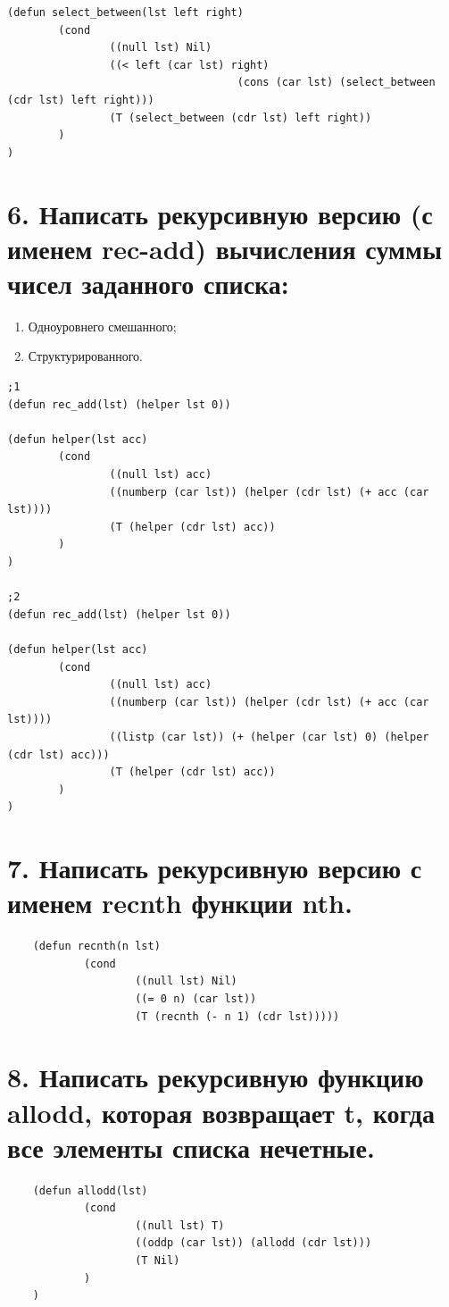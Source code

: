 \documentclass[12pt]{report}
\begin{document}
\begin{lstlisting}
(defun select_between(lst left right)
		(cond
				((null lst) Nil)
				((< left (car lst) right) 
									(cons (car lst) (select_between (cdr lst) left right)))
				(T (select_between (cdr lst) left right))
		)
)
\end{lstlisting}

\clearpage
\section*{6. Написать рекурсивную версию (с именем rec-add) вычисления суммы чисел заданного списка:}

\begin{enumerate}
	\item Одноуровнего смешанного;
	\item Структурированного.
\end{enumerate}

\begin{lstlisting}
;1
(defun rec_add(lst) (helper lst 0))

(defun helper(lst acc)
		(cond
				((null lst) acc)
				((numberp (car lst)) (helper (cdr lst) (+ acc (car lst))))
				(T (helper (cdr lst) acc))
		)
)

;2
(defun rec_add(lst) (helper lst 0))

(defun helper(lst acc)
		(cond 
				((null lst) acc)
				((numberp (car lst)) (helper (cdr lst) (+ acc (car lst))))
				((listp (car lst)) (+ (helper (car lst) 0) (helper (cdr lst) acc)))
				(T (helper (cdr lst) acc))
		)
)
\end{lstlisting}

\section*{7. Написать рекурсивную версию с именем recnth функции nth.}

\begin{lstlisting}
	(defun recnth(n lst)
			(cond 
					((null lst) Nil)
					((= 0 n) (car lst))
					(T (recnth (- n 1) (cdr lst)))))
\end{lstlisting}


\section*{8. Написать рекурсивную функцию allodd, которая возвращает t, когда все элементы списка нечетные.}

\begin{lstlisting}
	(defun allodd(lst)
			(cond
					((null lst) T)
					((oddp (car lst)) (allodd (cdr lst)))
					(T Nil)
			)
	)
\end{lstlisting}
\end{document}
